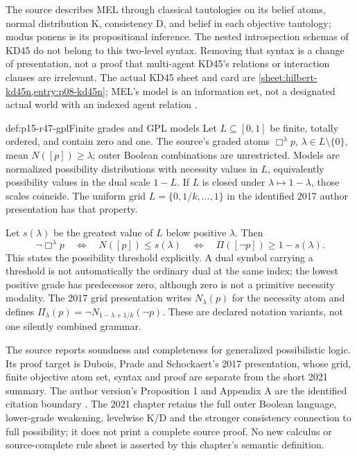 The source describes MEL through classical tautologies on its belief atoms,
normal distribution K, consistency D, and belief in each objective tautology;
modus ponens is its propositional inference. The nested introspection schemas
of KD45 do not belong to this two-level syntax. Removing that syntax is a
change of presentation, not a proof that multi-agent KD45's relations or
interaction clauses are irrelevant. The actual KD45 sheet and card are
\cref{sheet:hilbert-kd45n,entry:p08-kd45n}; MEL's model is an information set,
not a designated actual world with an indexed agent relation
\cite[\S3.1]{DuboisPrade2021RepresentingBelief}.

\begin{hbdefinition}{def:p15-r47-gpl}{Finite grades and GPL models}
Let \(L\subseteq[0,1]\) be finite, totally ordered, and contain zero and
one. The source's graded atoms \(\Box^\lambda p\), \(\lambda\in L\setminus\{0\}\),
mean \(N([p])\geq\lambda\); outer Boolean combinations are unrestricted.
Models are normalized possibility distributions with necessity values in
\(L\), equivalently possibility values in the dual scale \(1-L\).
If \(L\) is closed under \(\lambda\mapsto1-\lambda\), those scales coincide.
The uniform grid \(L=\{0,1/k,\ldots,1\}\) in the identified 2017 author
presentation has that property.

Let \(s(\lambda)\) be the greatest value of \(L\) below positive
\(\lambda\). Then
\[
 \neg\Box^\lambda p
 \quad\Longleftrightarrow\quad N([p])\leq s(\lambda)
 \quad\Longleftrightarrow\quad
 \Pi([\neg p])\geq1-s(\lambda).
\]
This states the possibility threshold explicitly. A dual symbol carrying a
threshold is not automatically the ordinary dual at the same index; the
lowest positive grade has predecessor zero, although zero is not a
primitive necessity modality. The 2017 grid presentation writes
\(N_\lambda(p)\) for the necessity atom and defines
\(\Pi_\lambda(p)=\neg N_{1-\lambda+1/k}(\neg p)\).
These are declared notation variants, not one silently combined grammar.
\end{hbdefinition}

The source reports soundness and completeness for generalized possibilistic
logic. Its proof target is Dubois, Prade and Schockaert's 2017 presentation,
whose grid, finite objective atom set, syntax and proof are separate from
the short 2021 summary. The author version's Proposition 1 and Appendix A
are the identified citation boundary
\cite[\S3.1--3.3 and Appendix~A, author version dated 9 August 2017]
{DuboisPradeSchockaert2017AuthorGPL}. The 2021 chapter retains the full
outer Boolean language, lower-grade weakening, levelwise K/D and the
stronger consistency connection to full possibility; it does not print a
complete source proof. No new calculus or source-complete rule sheet is
asserted by this chapter's semantic definition.

